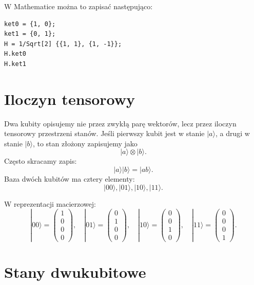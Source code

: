 W Mathematice można to zapisać następująco:
\begin{verbatim}
ket0 = {1, 0};
ket1 = {0, 1};
H = 1/Sqrt[2] {{1, 1}, {1, -1}};
H.ket0
H.ket1
\end{verbatim}

\section{Iloczyn tensorowy}

Dwa kubity opisujemy nie przez zwykłą parę wektorów, lecz przez iloczyn tensorowy przestrzeni stanów. Jeśli pierwszy kubit jest w stanie \(|a\rangle\), a drugi w stanie \(|b\rangle\), to stan złożony zapisujemy jako
\begin{equation}
    |a\rangle\otimes|b\rangle.
\end{equation}
Często skracamy zapis:
\begin{equation}
    |a\rangle|b\rangle=|ab\rangle.
\end{equation}
Baza dwóch kubitów ma cztery elementy:
\begin{equation}
    |00\rangle,
    |01\rangle,
    |10\rangle,
    |11\rangle.
\end{equation}

W reprezentacji macierzowej:
\begin{equation}
    |00\rangle=\begin{pmatrix}1\\0\\0\\0\end{pmatrix},
    \quad
    |01\rangle=\begin{pmatrix}0\\1\\0\\0\end{pmatrix},
    \quad
    |10\rangle=\begin{pmatrix}0\\0\\1\\0\end{pmatrix},
    \quad
    |11\rangle=\begin{pmatrix}0\\0\\0\\1\end{pmatrix}.
\end{equation}

\section{Stany dwukubitowe}

